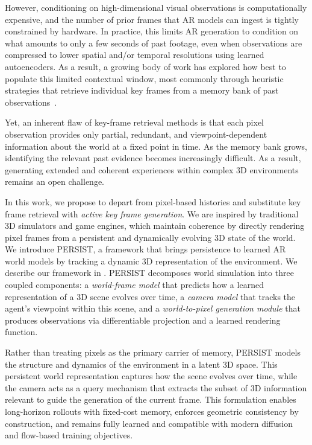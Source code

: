 \documentclass{article}
\theoremstyle{plain}
\theoremstyle{definition}
\theoremstyle{remark}
\begin{document}
However, conditioning on high-dimensional visual observations is computationally expensive, and the number of prior frames that AR models can ingest is tightly constrained by hardware.
In practice, this limits AR generation to condition on what amounts to only a few seconds of past footage, even when observations are compressed to lower spatial and/or temporal resolutions using learned autoencoders.
As a result, a growing body of work has explored how best to populate this limited contextual window, most commonly through heuristic strategies that retrieve individual key frames from a memory bank of past observations~\citep{xiao2025worldmem,huang2025memory}.

Yet, an inherent flaw of key-frame retrieval methods is that each pixel observation provides only partial, redundant, and viewpoint-dependent information about the world at a fixed point in time.
As the memory bank grows, identifying the relevant past evidence becomes increasingly difficult.
As a result, generating extended and coherent experiences within complex 3D environments remains an open challenge.%

In this work, we propose to depart from pixel-based histories and substitute key frame retrieval with \textit{active key frame generation}.
We are inspired by traditional 3D simulators and game engines, which maintain coherence by directly rendering pixel frames from a persistent and dynamically evolving 3D state of the world. We introduce PERSIST, a framework that brings persistence to learned AR world models by tracking a dynamic 3D representation of the environment. We describe our framework in .
PERSIST decomposes world simulation into three coupled components: a \textit{world-frame model} that predicts how a learned representation of a 3D scene evolves over time, a \textit{camera model} that tracks the agent’s viewpoint within this scene, and a \textit{world-to-pixel generation module} that produces observations via differentiable projection and a learned rendering function.

Rather than treating pixels as the primary carrier of memory, PERSIST models the structure and dynamics of the environment in a latent 3D space.
This persistent world representation captures how the scene evolves over time, while the camera acts as a query mechanism that extracts the subset of 3D information relevant to guide the generation of the current frame.
This formulation enables long-horizon rollouts with fixed-cost memory, enforces geometric consistency by construction, and remains fully learned and compatible with modern diffusion and flow-based training objectives.
\end{document}
